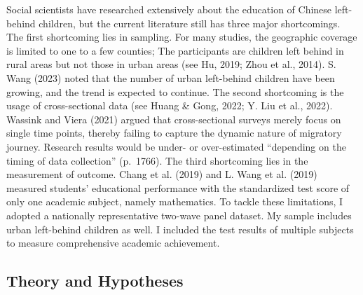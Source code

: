 \documentclass[
  man,floatsintext]{apa7}
\begin{document}
Social scientists have researched extensively about the education of Chinese left-behind children, but the current literature still has three major shortcomings. The first shortcoming lies in sampling. For many studies, the geographic coverage is limited to one to a few counties; The participants are children left behind in rural areas but not those in urban areas (see Hu, 2019; Zhou et al., 2014). S. Wang (2023) noted that the number of urban left-behind children have been growing, and the trend is expected to continue. The second shortcoming is the usage of cross-sectional data (see Huang \& Gong, 2022; Y. Liu et al., 2022). Wassink and Viera (2021) argued that cross-sectional surveys merely focus on single time points, thereby failing to capture the dynamic nature of migratory journey. Research results would be under- or over-estimated ``depending on the timing of data collection'' (p.~1766). The third shortcoming lies in the measurement of outcome. Chang et al. (2019) and L. Wang et al. (2019) measured students' educational performance with the standardized test score of only one academic subject, namely mathematics. To tackle these limitations, I adopted a nationally representative two-wave panel dataset. My sample includes urban left-behind children as well. I included the test results of multiple subjects to measure comprehensive academic achievement.

\hypertarget{theory-and-hypotheses}{%
\subsection{Theory and Hypotheses}\label{theory-and-hypotheses}}
\end{document}
